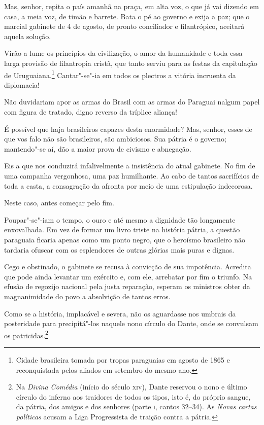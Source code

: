  Mas, senhor, repita o país amanhã na praça, em alta voz, o que já vai
dizendo em casa, a meia voz, de timão e barrete. Bata o pé ao governo e
exija a paz; que o marcial gabinete de 4 de agosto, de pronto
conciliador e filantrópico, aceitará aquela solução. 

 Virão a lume os princípios da civilização, o amor da humanidade e toda
essa larga provisão de filantropia cristã, que tanto serviu para as
festas da capitulação de
Uruguaiana.\footnote{ Cidade brasileira tomada por tropas paraguaias em agosto de 1865 e
reconquistada pelos aliados em setembro do mesmo ano.}
 Cantar"-se"-ia em todos os plectros a vitória incruenta da diplomacia!

 Não duvidariam apor as armas do Brasil com as armas do Paraguai nalgum
papel com figura de tratado, digno reverso da tríplice aliança!

É possível que haja brasileiros capazes desta enormidade? Mas, senhor,
esses de que vos falo não são brasileiros, são ambiciosos. Sua pátria é
o governo; mantendo"-se aí, dão a maior prova de civismo e abnegação. 

 Eis a que nos conduzirá infalivelmente a insistência do atual gabinete.
No fim de uma campanha vergonhosa, uma paz humilhante. Ao cabo de
tantos sacrifícios de toda a casta, a consagração da afronta por meio
de uma estipulação indecorosa. 

 Neste caso, antes começar pelo fim.

 Poupar"-se"-iam o tempo, o ouro e até mesmo a dignidade tão
longamente enxovalhada. Em vez de formar um livro triste na história
pátria, a questão paraguaia ficaria apenas como um ponto negro, que o
heroísmo brasileiro não tardaria ofuscar com os esplendores de outras
glórias mais puras e dignas.

 Cego e obstinado, o gabinete se recusa à convicção de sua impotência.
Acredita que pode ainda levantar um exército e, com ele, arrebatar por
fim o triunfo. Na efusão de regozijo nacional pela justa reparação,
esperam os ministros obter da magnanimidade do povo a absolvição de
tantos erros.

 Como se a história, implacável e severa, não os aguardasse nos umbrais
da posteridade para precipitá"-los naquele nono círculo do Dante, onde
se convulsam os
patricidas.\footnote{ Na \textit{Divina Comédia} (início do século \textsc{xiv}), Dante reservou o nono e
último círculo do inferno aos traidores de todos os tipos, isto é, do
próprio sangue, da pátria, dos amigos e dos senhores (parte \textsc{i}, cantos
32--34). As \textit{Novas cartas políticas} acusam a Liga Progressista
de traição contra a pátria.}
 
